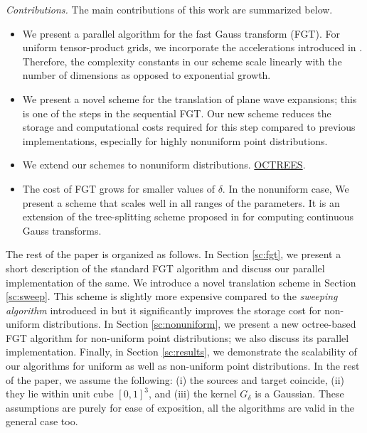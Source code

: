 {\em Contributions.} The main contributions of this work are summarized below.
\begin{itemize} 
%
\item We present a parallel algorithm for the fast Gauss transform (FGT). For uniform tensor-product grids, we incorporate
 the accelerations introduced in \cite{fggt}. Therefore, the complexity constants in our scheme scale linearly with 
 the number of dimensions as opposed to exponential growth. 
%
\item We present a novel scheme for the translation of plane wave expansions; this is one of the steps in the
 sequential FGT. Our new scheme reduces the storage and computational costs required for this step compared to
  previous implementations, especially for highly nonuniform point distributions.
%
\item We extend our schemes to nonuniform distributions. \ul{OCTREES}.

\item The cost of FGT grows for smaller values of $\delta$. In the nonuniform case, 
We present a scheme that scales well in all ranges of the parameters. It is an extension of the
 tree-splitting scheme proposed in \cite{veerapaneni08} for computing continuous Gauss transforms. 
%
\end{itemize}

The rest of the paper is organized as follows. In Section \ref{sc:fgt}, we present a short description of the
 standard FGT algorithm and discuss our parallel implementation of the same. We introduce a novel translation scheme 
 in Section \ref{sc:sweep}. This scheme is slightly more expensive compared to the {\em sweeping algorithm} introduced 
 in \cite{greengard98} but it significantly improves the storage cost for non-uniform distributions. In Section 
\ref{sc:nonuniform}, we present a new octree-based FGT algorithm for non-uniform point distributions; we also discuss
 its parallel implementation. Finally, in Section \ref{sc:results}, we demonstrate the scalability of our algorithms 
 for uniform as well as non-uniform point distributions. In the rest of the paper, we assume the following: (i) the 
 sources and target coincide, (ii) they lie within unit cube $[0, 1]^3$, and (iii) the kernel $G_\delta$ is a Gaussian. These
 assumptions are purely for ease of exposition, all the algorithms are valid in the general case too. 
 
